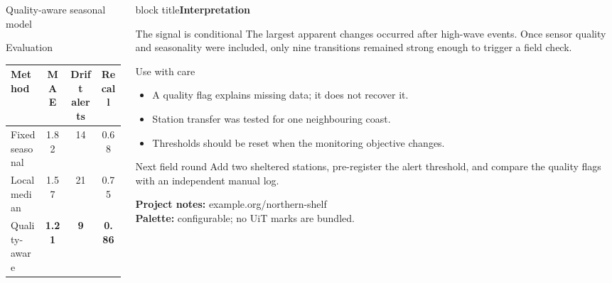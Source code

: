 \documentclass[final]{beamer}
\newcommand{\stripe}[1]{\begin{beamercolorbox}[wd=\linewidth,sep=0.55em]{block title}\Large\bfseries #1\end{beamercolorbox}\vspace{0.35em}}
\begin{document}
\begin{frame}[t]
\begin{columns}[t,totalwidth=0.96\paperwidth]
\begin{column}{0.36\paperwidth}
\begin{block}{Quality-aware seasonal model}
      \end{block}
      \begin{block}{Evaluation}
        \centering
        \begin{tabular}{lccc}
          \toprule Method & MAE & Drift alerts & Recall\\\midrule
          Fixed seasonal & 1.82 & 14 & 0.68\\
          Local median & 1.57 & 21 & 0.75\\
          Quality-aware & \textbf{1.21} & \textbf{9} & \textbf{0.86}\\
          \bottomrule
        \end{tabular}
      \end{block}
    \end{column}
    \begin{column}{0.23\paperwidth}
      \stripe{Interpretation}
      \begin{block}{The signal is conditional}
        The largest apparent changes occurred after high-wave events. Once
        sensor quality and seasonality were included, only nine transitions
        remained strong enough to trigger a field check.
      \end{block}
      \begin{block}{Use with care}
        \begin{itemize}\itemsep0.35em
          \item A quality flag explains missing data; it does not recover it.
          \item Station transfer was tested for one neighbouring coast.
          \item Thresholds should be reset when the monitoring objective changes.
        \end{itemize}
      \end{block}
      \begin{block}{Next field round}
        Add two sheltered stations, pre-register the alert threshold, and
        compare the quality flags with an independent manual log.
      \end{block}
      \vfill\small\textbf{Project notes:} example.org/northern-shelf\\[0.3em]
      \textbf{Palette:} configurable; no UiT marks are bundled.
    \end{column}
  \end{columns}
\end{frame}
\end{document}
